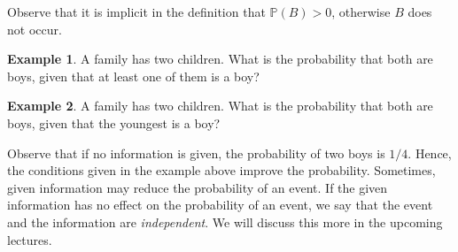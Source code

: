\documentclass[12pt]{article}
\newcommand{\prob}{\mathbb{P}}
\theoremstyle{plain}
\theoremstyle{definition}
\newtheorem*{example}{Example}
\theoremstyle{remark}
\numberwithin{equation}{section}  %
\begin{document}
Observe that it is implicit in the definition that $\prob(B) > 0$, otherwise
$B$ does not occur.
\begin{example}
    A family has two children. What is the probability that both are boys,
    given that at least one of them is a boy?
\end{example}
\begin{example}
    A family has two children. What is the probability that both are boys,
    given that the youngest is a boy?
\end{example}
Observe that if no information is given, the probability of two boys is $1/4$.
Hence, the conditions given in the example above improve the probability.
Sometimes, given information may reduce the probability of an event.
If the given information has no effect on the probability of an event,
we say that the event and the information are \emph{independent}. We will
discuss this more in the upcoming lectures.
\end{document}
